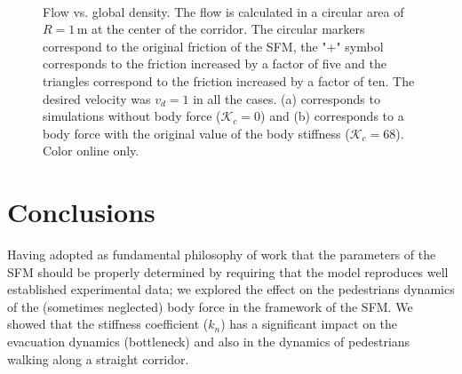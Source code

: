 \documentclass[preprint,12pt]{elsarticle}
\begin{document}
\begin{figure}[!htbp]
\centering
{}\ 
\\
\caption[width=0.47\columnwidth]{Flow vs. global density. The flow is calculated
in a circular area of $R=1\,$m at the center of the corridor. The circular 
markers correspond to the original friction of the SFM, the "+" symbol 
corresponds to the friction increased by a factor of five and the triangles 
correspond to the friction increased by a factor of ten. The desired velocity 
was $v_d=1$ in all the cases. (a) corresponds to simulations without body force 
($\mathcal{K}_c =$0) and (b) corresponds to a body force with the original value
 of the body stiffness ($\mathcal{K}_c =$68). Color online only.}
\label{flow_density}
\end{figure}



\section{\label{conclusions}Conclusions}


Having adopted as fundamental philosophy of work that the parameters of the SFM
should be properly determined by requiring that the model reproduces
well established experimental data; we explored the effect on the pedestrians
dynamics of the (sometimes neglected) body force in the framework of the SFM. We
showed that the stiffness coefficient ($k_n$) has a significant impact on the
evacuation dynamics (bottleneck) and also in the dynamics of pedestrians walking
along a straight corridor.\\
\end{document}
